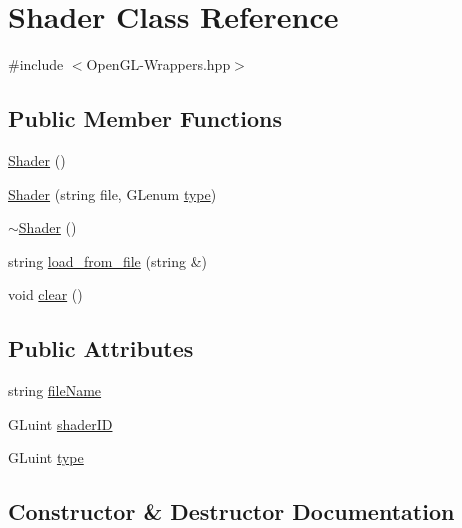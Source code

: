 \hypertarget{classShader}{}\section{Shader Class Reference}
\label{classShader}


{\ttfamily \#include $<$Open\+G\+L-\/\+Wrappers.\+hpp$>$}

\subsection*{Public Member Functions}
\begin{DoxyCompactItemize}
\item 
\mbox{\hyperlink{classShader_a0d654ebaca4e0555197c0724c6d30610}{Shader}} ()
\item 
\mbox{\hyperlink{classShader_a7933b4a0a4d8446c8df9e3c6118a80bf}{Shader}} (string file, G\+Lenum \mbox{\hyperlink{classShader_a855410473ea5bf5ea56e37f6c09543da}{type}})
\item 
\mbox{\hyperlink{classShader_aff01df87e8a102f270b5b135a295e59d}{$\sim$\+Shader}} ()
\item 
string \mbox{\hyperlink{classShader_ad643b976d3d920e95bf6f9f4848e6049}{load\+\_\+from\+\_\+file}} (string \&)
\item 
void \mbox{\hyperlink{classShader_a59d3c7d6dcb0d0801e836b7a11d8095f}{clear}} ()
\end{DoxyCompactItemize}
\subsection*{Public Attributes}
\begin{DoxyCompactItemize}
\item 
string \mbox{\hyperlink{classShader_a32243cdb8d63a829450d0a46686c629b}{file\+Name}}
\item 
G\+Luint \mbox{\hyperlink{classShader_ae94be9c66b18fe70ed6ec0863b416bdf}{shader\+ID}}
\item 
G\+Luint \mbox{\hyperlink{classShader_a855410473ea5bf5ea56e37f6c09543da}{type}}
\end{DoxyCompactItemize}


\subsection{Constructor \& Destructor Documentation}
\mbox{\label{classShader_a0d654ebaca4e0555197c0724c6d30610}} 
